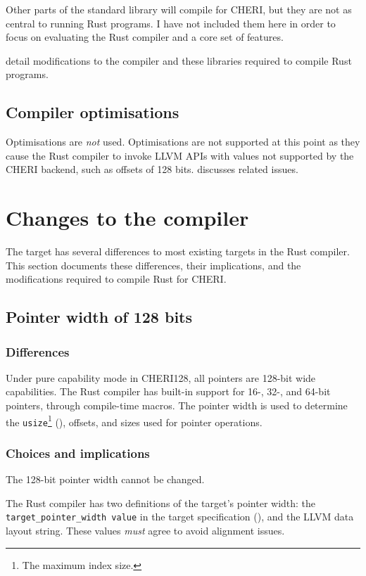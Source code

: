 \documentclass[dissertation.tex]{subfiles}
\begin{document}
Other parts of the standard library will compile for CHERI, but they are
not as central to running Rust programs.
I have not included them here in order to focus on evaluating the Rust
compiler and a core set of features.

 detail modifications to
the compiler and these libraries required to compile Rust programs.

\subsection{Compiler optimisations}
Optimisations are \emph{not} used.
Optimisations are not supported at this point as they cause the Rust
compiler to invoke LLVM APIs with values not supported by the CHERI
backend, such as offsets of 128 bits.
 discusses related issues.


\section{Changes to the compiler}
\label{sec:impl-div-compiler}

The \cuf target has several differences to most existing targets in the
Rust compiler.
This section documents these differences, their implications, and the
modifications required to compile Rust for CHERI.


\subsection{Pointer width of 128 bits}
\label{sec:impl-width}

\subsubsection{Differences}
Under pure capability mode in CHERI128, all pointers are 128-bit wide
capabilities.
The Rust compiler has built-in support for 16-, 32-, and 64-bit
pointers, through compile-time macros.
The pointer width is used to determine the \texttt{usize}\footnote{The
maximum index size.} (), offsets, and sizes used
for pointer operations.

\subsubsection{Choices and implications}
The 128-bit pointer width cannot be changed.

The Rust compiler has two definitions of the target's pointer width: the
\texttt{target\_pointer\_width value} in the target specification
(), and the LLVM data layout string.
These values \emph{must} agree to avoid alignment issues.
\end{document}
